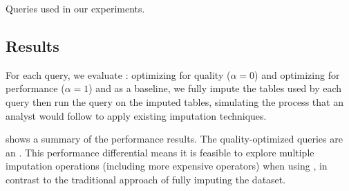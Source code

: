 \begin{table}
  \centering
  
  \vspace{1ex}
  \caption{Queries used in our experiments.}\label{tbl:queries}
\end{table}

%  

\subsection{Results}\label{sec:results}

For each query, we evaluate : \ProjectName{} optimizing for quality ($\alpha=0$) and \ProjectName{} optimizing for performance ($\alpha=1$) and as a baseline, we fully impute the tables used by each query then run the query on the imputed tables, simulating the process that an analyst would follow to apply existing imputation techniques.

 shows a summary of the performance results. The quality-optimized
queries are an . This performance
differential means it is feasible
to explore multiple imputation operations (including more expensive operators) when using
\ProjectName{}, in contrast to the traditional approach of fully imputing the dataset.

